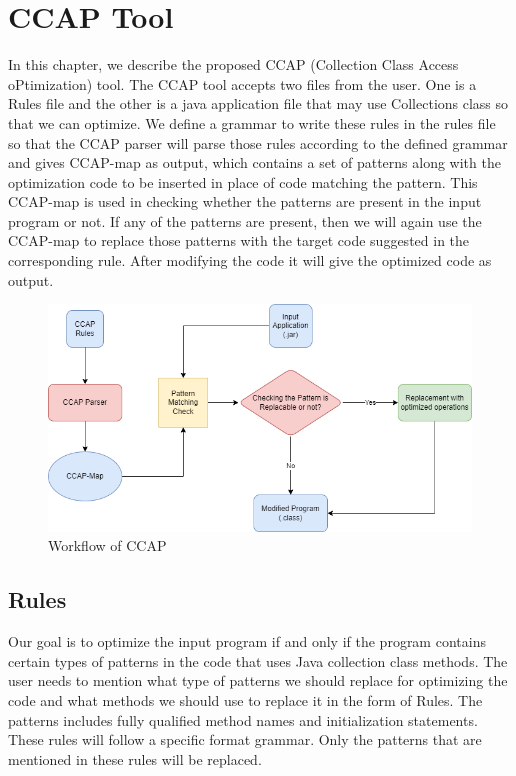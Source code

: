 \chapter{CCAP Tool}
In this chapter, we describe the proposed CCAP (Collection Class Access oPtimization) tool.
The CCAP tool accepts two files from the user. One is a Rules file and the other is a java application file that may use Collections class so that we can optimize. We define a grammar to write these rules in the rules file so that the CCAP parser will parse those rules according to the defined grammar and gives CCAP-map as output, which contains a set of patterns along with the optimization code to be inserted in place of code matching the pattern. This CCAP-map is used in checking whether the patterns are present in the input program or not. If any of the patterns are present, then we will again use the CCAP-map to replace those patterns with the target code suggested in the corresponding rule. After modifying the code it will give the optimized code as output.

\begin{figure} [h]
    \centering
    \includegraphics[width = \textwidth]{images/CCAP_tool.png}
    \caption{Workflow of CCAP}
    \label{fig:my_label}
\end{figure}

\section{Rules}
Our goal is to optimize the input program if and only if the program contains certain types of patterns in the code that uses Java collection class methods. The user needs to mention what type of patterns we should replace for optimizing the code and what methods we should use to replace it in the form of Rules. The patterns includes fully qualified method names and initialization statements. These rules will follow a specific format grammar. Only the patterns that are mentioned in these rules will be replaced.


